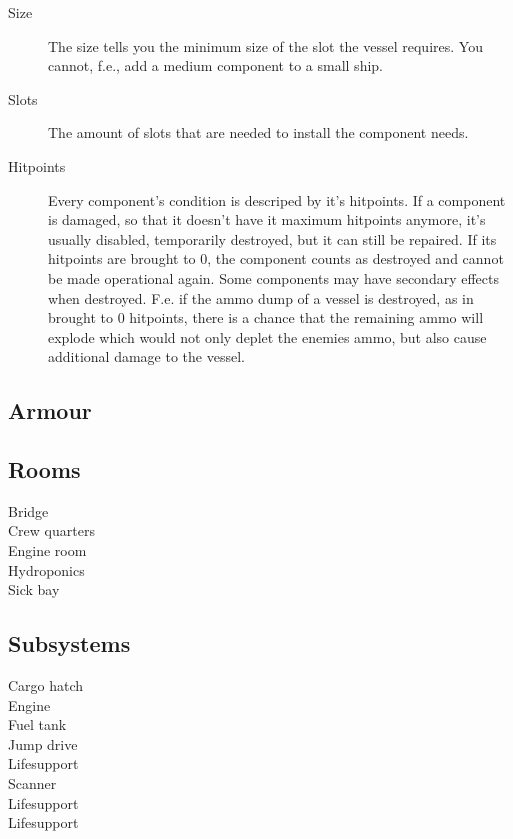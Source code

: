 \begin{description}
  \item[Size] The size tells you the minimum size of the slot the vessel requires. You cannot, f.e., add a medium component to a small ship.
  \item[Slots] The amount of slots that are needed to install the component needs.
  \item[Hitpoints] Every component's condition is descriped by it's hitpoints. If a component is damaged, so that it doesn't have it maximum hitpoints anymore, it's usually disabled, temporarily destroyed, but it can still be repaired. If its hitpoints are brought to 0, the component counts as destroyed and cannot be made operational again. Some components may have secondary effects when destroyed. F.e. if the ammo dump of a vessel is destroyed, as in brought to 0 hitpoints, there is a chance that the remaining ammo will explode which would not only deplet the enemies ammo, but also cause additional damage to the vessel.
\end{description}

\subsection{Armour}
\label{sub:Vessel-Armour}

\subsection{Rooms}
\label{sub:Vessel-Rooms}

\begin{description}
  \item[Bridge]
  \item[Crew quarters]
  \item[Engine room]
  \item[Hydroponics]
  \item[Sick bay]
\end{description}

\subsection{Subsystems}
\label{sub:Vessel-Subsystems}

\begin{description}
  \item[Cargo hatch]
  \item[Engine]
  \item[Fuel tank]
  \item[Jump drive]
  \item[Lifesupport]
  \item[Scanner]
  \item[Lifesupport]
  \item[Lifesupport]
\end{description}


